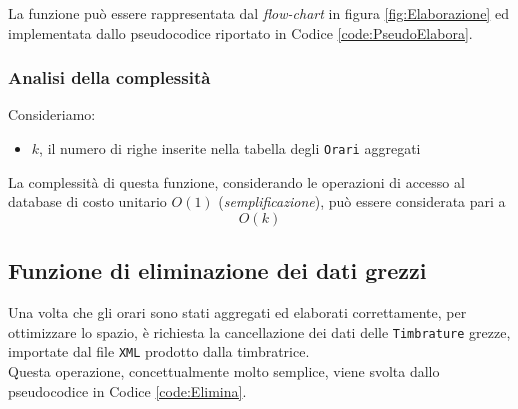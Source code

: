\noindent
La funzione può essere rappresentata dal \textit{flow-chart} in figura \ref{fig:Elaborazione} ed implementata dallo pseudocodice riportato in Codice \ref{code:PseudoElabora}.





\subsubsection{Analisi della complessità}
Consideriamo:
\begin{itemize}
	\item $k$, il numero di righe inserite nella tabella degli \verb|Orari| aggregati
\end{itemize}
La complessità di questa funzione, considerando le operazioni di accesso al database di costo unitario $O(1)$ (\textit{semplificazione}), può essere considerata pari a
\begin{equation}
	O(k)
\end{equation}
\subsection{Funzione di eliminazione dei dati grezzi}
Una volta che gli orari sono stati aggregati ed elaborati correttamente, per ottimizzare lo spazio, è richiesta la cancellazione dei dati delle \verb|Timbrature| grezze, importate dal file \verb|XML| prodotto dalla timbratrice.\\

\noindent
Questa operazione, concettualmente molto semplice, viene svolta dallo pseudocodice in Codice \ref{code:Elimina}.

